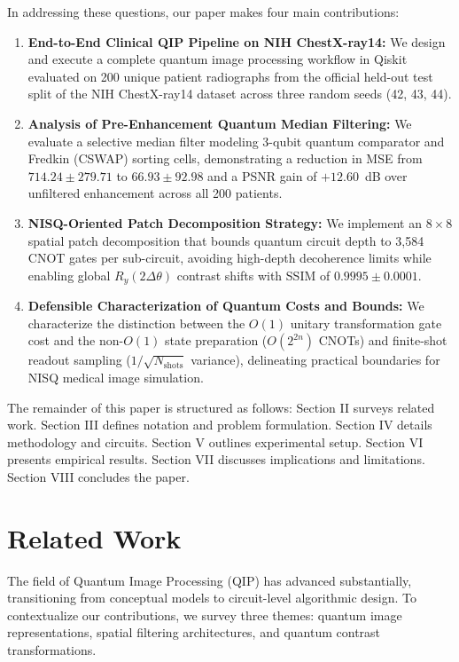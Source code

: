 \documentclass[12pt,onecolumn,draftclsnofoot]{IEEEtran}
\begin{document}
In addressing these questions, our paper makes four main contributions:
\begin{enumerate}
    \item \textbf{End-to-End Clinical QIP Pipeline on NIH ChestX-ray14:} We design and execute a complete quantum image processing workflow in Qiskit evaluated on 200 unique patient radiographs from the official held-out test split of the NIH ChestX-ray14 dataset across three random seeds (42, 43, 44).
    \item \textbf{Analysis of Pre-Enhancement Quantum Median Filtering:} We evaluate a selective median filter modeling 3-qubit quantum comparator and Fredkin (CSWAP) sorting cells, demonstrating a reduction in MSE from $714.24 \pm 279.71$ to $66.93 \pm 92.98$ and a PSNR gain of $+12.60$~dB over unfiltered enhancement across all 200 patients.
    \item \textbf{NISQ-Oriented Patch Decomposition Strategy:} We implement an $8\times8$ spatial patch decomposition that bounds quantum circuit depth to 3,584 CNOT gates per sub-circuit, avoiding high-depth decoherence limits while enabling global $R_y(2\Delta\theta)$ contrast shifts with SSIM of $0.9995 \pm 0.0001$.
    \item \textbf{Defensible Characterization of Quantum Costs and Bounds:} We characterize the distinction between the $O(1)$ unitary transformation gate cost and the non-$O(1)$ state preparation ($O(2^{2n})$ CNOTs) and finite-shot readout sampling ($1/\sqrt{N_{\text{shots}}}$ variance), delineating practical boundaries for NISQ medical image simulation.
\end{enumerate}

The remainder of this paper is structured as follows: Section II surveys related work. Section III defines notation and problem formulation. Section IV details methodology and circuits. Section V outlines experimental setup. Section VI presents empirical results. Section VII discusses implications and limitations. Section VIII concludes the paper.
\section{Related Work}
The field of Quantum Image Processing (QIP) has advanced substantially, transitioning from conceptual models to circuit-level algorithmic design. To contextualize our contributions, we survey three themes: quantum image representations, spatial filtering architectures, and quantum contrast transformations.
\end{document}
